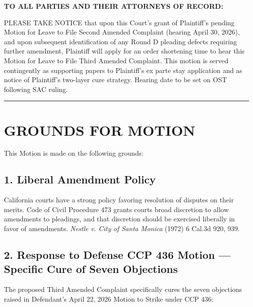 \vspace*{6mm}
\linenumbers
\textbf{TO ALL PARTIES AND THEIR ATTORNEYS OF RECORD:}

PLEASE TAKE NOTICE that upon this Court's grant of Plaintiff's pending Motion for Leave to File Second Amended Complaint (hearing April 30, 2026), and upon subsequent identification of any Round D pleading defects requiring further amendment, Plaintiff will apply for an order shortening time to hear this Motion for Leave to File Third Amended Complaint. This motion is served contingently as supporting papers to Plaintiff's ex parte stay application and as notice of Plaintiff's two-layer cure strategy. Hearing date to be set on OST following SAC ruling.

\begin{center}\rule{0.5\linewidth}{0.5pt}\end{center}

\section{GROUNDS FOR MOTION}\label{grounds-for-motion}

This Motion is made on the following grounds:

\subsection{1. Liberal Amendment Policy}\label{liberal-amendment-policy}

California courts have a strong policy favoring resolution of disputes on their merits. Code of Civil Procedure \textsection{} 473 grants courts broad discretion to allow amendments to pleadings, and that discretion should be exercised liberally in favor of amendments. \emph{Nestle v. City of Santa Monica} (1972) 6 Cal.3d 920, 939.

\subsection{2. Response to Defense CCP \textsection{} 436 Motion --- Specific Cure of Seven Objections}\label{response-to-defense-ccp-436-motion-specific-cure-of-seven-objections}

The proposed Third Amended Complaint specifically cures the seven objections raised in Defendant's April 22, 2026 Motion to Strike under CCP \textsection{} 436:

